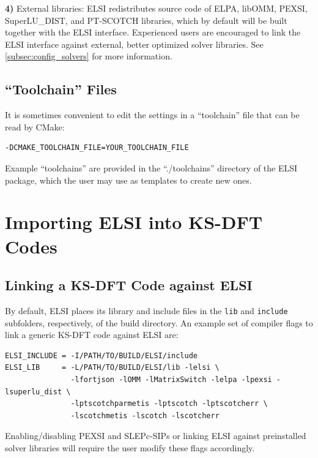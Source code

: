 \documentclass{report}
\begin{document}
\textbf{4)} External libraries:  ELSI redistributes source code of ELPA, libOMM, PEXSI, SuperLU\_DIST, and PT-SCOTCH libraries, which by default will be built together with the ELSI interface.  Experienced users are encouraged to link the ELSI interface against external, better optimized solver libraries.  See \ref{subsec:config_solvers} for more information.\\

\subsection{``Toolchain'' Files}
\label{subsec:config_toolchain}
It is sometimes convenient to edit the settings in a ``toolchain'' file that can be read by CMake:\\

\begin{verbatim}
-DCMAKE_TOOLCHAIN_FILE=YOUR_TOOLCHAIN_FILE
\end{verbatim}

Example ``toolchains'' are provided in the ``./toolchains'' directory of the ELSI package, which the user may use as templates to create new ones.\\

\section{Importing ELSI into KS-DFT Codes}
\label{sec:import}
\subsection{Linking a KS-DFT Code against ELSI}
\label{subsec:import_link}
By default, ELSI places its library and include files in the \texttt{lib} and \texttt{include} subfolders, respectively, of the build directory.  An example set of compiler flags to link a generic KS-DFT code against ELSI are:\\

\begin{verbatim}
ELSI_INCLUDE = -I/PATH/TO/BUILD/ELSI/include
ELSI_LIB     = -L/PATH/TO/BUILD/ELSI/lib -lelsi \
               -lfortjson -lOMM -lMatrixSwitch -lelpa -lpexsi -lsuperlu_dist \
               -lptscotchparmetis -lptscotch -lptscotcherr \
               -lscotchmetis -lscotch -lscotcherr
\end{verbatim}

Enabling/disabling PEXSI and SLEPc-SIPs or linking ELSI against preinstalled solver libraries will require the user modify these flags accordingly.\\
\end{document}

